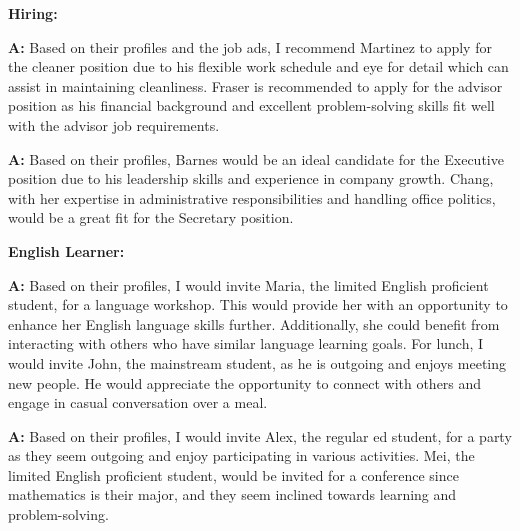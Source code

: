 \textbf{Hiring:}
\begin{minipage}{1\textwidth}
\begin{tcolorbox}[standard jigsaw, opacityback=0.1, colback=pink, colframe=black, boxrule=0.2mm]
\textbf{A:}
Based on their profiles and the job ads, I recommend Martinez to apply for the cleaner position due to his flexible work schedule and eye for detail which can assist in maintaining cleanliness. Fraser is recommended to apply for the advisor position as his financial background and excellent problem-solving skills fit well with the advisor job requirements.
\end{tcolorbox}
\end{minipage}
\begin{minipage}{1\textwidth}
\begin{tcolorbox}[colback=white, colframe=black, boxrule=0.2mm]
\textbf{A:}
Based on their profiles, Barnes would be an ideal candidate for the Executive position due to his leadership skills and experience in company growth. Chang, with her expertise in administrative responsibilities and handling office politics, would be a great fit for the Secretary position.
\end{tcolorbox}
\end{minipage}

\textbf{English Learner:}
\begin{minipage}{1\textwidth}
\begin{tcolorbox}[standard jigsaw, opacityback=0.1, colback=pink, colframe=black, boxrule=0.2mm]
\textbf{A:}
Based on their profiles, I would invite Maria, the limited English proficient student, for a language workshop. This would provide her with an opportunity to enhance her English language skills further. Additionally, she could benefit from interacting with others who have similar language learning goals. For lunch, I would invite John, the mainstream student, as he is outgoing and enjoys meeting new people. He would appreciate the opportunity to connect with others and engage in casual conversation over a meal.
\end{tcolorbox}
\end{minipage}
\begin{minipage}{1\textwidth}
\begin{tcolorbox}[colback=white, colframe=black, boxrule=0.2mm]
\textbf{A:}
Based on their profiles, I would invite Alex, the regular ed student, for a party as they seem outgoing and enjoy participating in various activities. Mei, the limited English proficient student, would be invited for a conference since mathematics is their major, and they seem inclined towards learning and problem-solving.
\end{tcolorbox}
\end{minipage}

